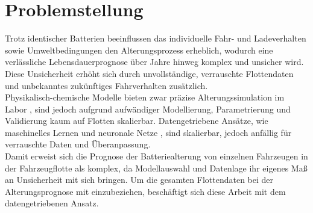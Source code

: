 \section{Problemstellung}
Trotz identischer Batterien beeinflussen das individuelle Fahr- \cite{urlIdBatterieAlterungVerschiedenerSoCLithiumBatterien} und Ladeverhalten \cite{urlIdBatterieAlterungVerschiedenerSoCLithiumBatterien} sowie Umweltbedingungen \cite{urlIdBatterieAlterungTemperatur} den Alterungsprozess erheblich, wodurch eine verlässliche Lebensdauerprognose über Jahre hinweg komplex und unsicher wird. Diese Unsicherheit erhöht sich durch unvollständige, verrauschte Flottendaten \cite{idEigeneFlottenDaten} und unbekanntes zukünftiges Fahrverhalten zusätzlich.\\
Physikalisch-chemische Modelle bieten zwar präzise Alterungssimulation im Labor \cite{urlIdPhysicalAgingMethodsForLIBs}, sind jedoch aufgrund aufwändiger Modellierung, Parametrierung und Validierung kaum auf Flotten skalierbar. Datengetriebene Ansätze, wie maschinelles Lernen und neuronale Netze \cite{urlIdDataAgingMethodsForLIBs}, sind skalierbar, jedoch anfällig für verrauschte Daten und Überanpassung.\\
Damit erweist sich die Prognose der Batteriealterung von einzelnen Fahrzeugen in der Fahrzeugflotte als komplex, da Modellauswahl und Datenlage ihr eigenes Maß an Unsicherheit mit sich bringen. Um die gesamten Flottendaten bei der Alterungsprognose mit einzubeziehen, beschäftigt sich diese Arbeit mit dem datengetriebenen Ansatz.

\pagebreak
